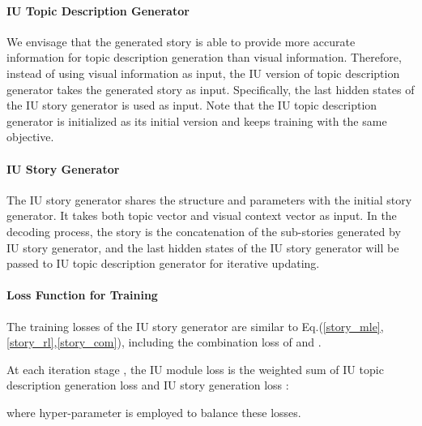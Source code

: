 \documentclass[11pt]{article}
\begin{document}
\paragraph{IU Topic Description Generator}
We envisage that the generated story is able to provide more accurate information for topic description generation than visual information. Therefore, instead of using visual information as input, the IU version of topic description generator takes the generated story as input. Specifically, the last hidden states  of the IU story generator is used as input. Note that the IU topic description generator is initialized as its initial version and keeps training with the same objective. 



\begin{comment}
Note that the IU topic extractor is the same as mentioned in previous. Similarly, the topic extractor produces topic hidden states ( ) sequently as the topic vectors, and also produces a probability distribution  over the whole topic vocabulary . The training loss of IU topic extractor is the cross-entropy loss  between the generated topic distribution  and the ground-truth topic distribution .
\end{comment}

\paragraph{IU Story Generator}
The IU story generator shares the structure and parameters with the initial story generator. It takes both topic vector and visual context vector as input. In the decoding process, the story  is the concatenation of the sub-stories  generated by IU story generator, and the last hidden states  of the IU story generator will be passed to IU topic description generator for iterative updating.


\paragraph{Loss Function for Training}

The training losses of the IU story generator are similar to Eq.(\ref{story_mle},\ref{story_rl},\ref{story_com}), including the combination loss  of  and . 

At each iteration stage , the IU module loss  is the weighted sum of IU topic description generation loss  and IU story generation loss :
{
\setlength\abovedisplayskip{3pt}
\setlength\belowdisplayskip{3pt}

}where hyper-parameter  is employed to balance these losses.
\end{document}
